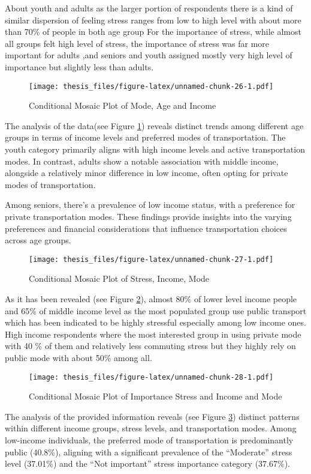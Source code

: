 \documentclass[
11pt, %
oneside, %
english, %
singlespacing, %
]{macthesis} %
\begin{document}
About youth and adults as the larger portion of respondents there is a kind of similar dispersion of feeling stress ranges from low to high level with about more than 70\% of people in both age group For the importance of stress, while almost all groups felt high level of stress, the importance of stress was far more important for adults ,and seniors and youth assigned mostly very high level of importance but slightly less than adults.
\begin{figure}
\centering
\texttt{[image: thesis\_files/figure-latex/unnamed-chunk-26-1.pdf]}
\caption{\label{fig:unnamed-chunk-26}\label{fig:Income-mode-Age}Conditional Mosaic Plot of Mode, Age and Income}
\end{figure}
The analysis of the data(see Figure \ref{fig:Income-mode-Age}) reveals distinct trends among different age groups in terms of income levels and preferred modes of transportation. The youth category primarily aligns with high income levels and active transportation modes. In contrast, adults show a notable association with middle income, alongside a relatively minor difference in low income, often opting for private modes of transportation.

Among seniors, there's a prevalence of low income status, with a preference for private transportation modes. These findings provide insights into the varying preferences and financial considerations that influence transportation choices across age groups.
\begin{figure}
\centering
\texttt{[image: thesis\_files/figure-latex/unnamed-chunk-27-1.pdf]}
\caption{\label{fig:unnamed-chunk-27}\label{fig:IMS}Conditional Mosaic Plot of Stress, Income, Mode}
\end{figure}
As it has been revealed (see Figure \ref{fig:IMS}), almost 80\% of lower level income people and 65\% of middle income level as the most populated group use public transport which has been indicated to be highly stressful especially among low income ones. High income respondents where the most interested group in using private mode with 40 \% of them and relatively less commuting stress but they highly rely on public mode with about 50\% among all.
\begin{figure}
\centering
\texttt{[image: thesis\_files/figure-latex/unnamed-chunk-28-1.pdf]}
\caption{\label{fig:unnamed-chunk-28}\label{fig:Income-mode-and-importance-stress}Conditional Mosaic Plot of Importance Stress and Income and Mode}
\end{figure}
The analysis of the provided information reveals (see Figure \ref{fig:Income-mode-and-importance-stress}) distinct patterns within different income groups, stress levels, and transportation modes. Among low-income individuals, the preferred mode of transportation is predominantly public (40.8\%), aligning with a significant prevalence of the ``Moderate'' stress level (37.01\%) and the ``Not important'' stress importance category (37.67\%).
\end{document}
